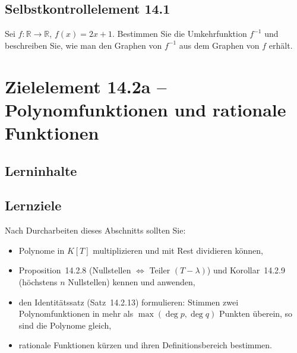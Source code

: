 \documentclass[a4paper,12pt]{article}
\begin{document}
\subsection*{Selbstkontrollelement 14.1}

Sei $f: \mathbb{R} \to \mathbb{R}$, $f(x) = 2x + 1$. Bestimmen Sie die Umkehrfunktion
$f^{-1}$ und beschreiben Sie, wie man den Graphen von $f^{-1}$ aus dem Graphen von
$f$ erhält.

\newpage

\section*{Zielelement 14.2a -- Polynomfunktionen und rationale Funktionen}

\subsection*{Lerninhalte}

\begin{center}
\end{center}

\subsection*{Lernziele}

Nach Durcharbeiten dieses Abschnitts sollten Sie:
\begin{itemize}
  \item Polynome in $K[T]$ multiplizieren und mit Rest dividieren können,
  \item Proposition~14.2.8 (Nullstellen $\Leftrightarrow$ Teiler $(T-\lambda)$) und
        Korollar~14.2.9 (höchstens $n$ Nullstellen) kennen und anwenden,
  \item den Identitätssatz (Satz~14.2.13) formulieren: Stimmen zwei Polynomfunktionen
        in mehr als $\max(\deg p, \deg q)$ Punkten überein, so sind die Polynome gleich,
  \item rationale Funktionen kürzen und ihren Definitionsbereich bestimmen.
\end{itemize}
\end{document}
